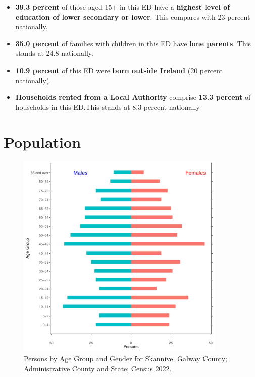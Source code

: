 \documentclass{article}
\begin{document}
\begin{itemize}
\item \textbf{39.3 percent} of those aged 15+ in this ED have a \textbf{highest level of education of lower secondary or lower}. This compares with 23 percent nationally. 

\item \textbf{35.0 percent} of families with children in this ED have \textbf{lone parents}. This stands at 24.8 nationally.

\item \textbf{10.9 percent} of this ED were \textbf{born outside Ireland} (20 percent nationally).

\item \textbf{Households rented from a Local Authority} comprise \textbf{13.3 percent} of households in this ED.This stands at 8.3 percent nationally

\end{itemize}

\pagebreak

\section{Population} 
\label{sect:Pop}

\begin{figure}[h]
	\centering
	\includegraphics[width = 100mm]{../figures/PyramidPlot.pdf}
	\caption{Persons by Age Group and Gender for Skannive, Galway County; Administrative County and State; Census 2022.}
	\label{fig:2ae19629-1a6a-13a3-e055-000000000001}
	\end{figure}
\end{document}
